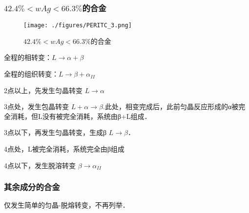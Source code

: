 





\subsubsection{$42.4\%<wAg<66.3\%$的合金}
\begin{figure}[ht]
\centering
\texttt{[image: ./figures/PERITC\_3.png]}
\caption{$42.4\%<wAg<66.3\%$的合金} \label{PERITC_fig3}
\end{figure}
全程的相转变：$L \rightarrow \alpha+\beta$

全程的组织转变：$L \rightarrow \beta + \alpha_{II}$

2点以上，先发生匀晶转变 $L \rightarrow \alpha$

3点处，发生包晶转变 $L + \alpha \rightarrow \beta$.此处，相变完成后，此前匀晶反应形成的α被完全消耗，但L没有被完全消耗，系统由β+L组成．

3点以下，再发生匀晶转变，生成β $L \rightarrow \beta$．

4点处，L被完全消耗，系统完全由β组成

4点以下，发生脱溶转变 $\beta \rightarrow \alpha_{II}$

\subsubsection{其余成分的合金}
仅发生简单的匀晶-脱熔转变，不再列举．

